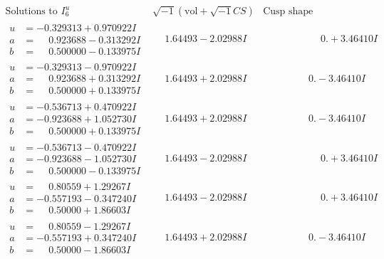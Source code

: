 \documentclass[1p]{elsarticle_modified}
\theoremstyle{definition}
\newcommand{\I}{\sqrt{-1}}
\begin{document}
$$\begin{array}{c|c|c}  
\text{Solutions to }I^u_{6}& \I (\text{vol} + \sqrt{-1}CS) & \text{Cusp shape}\\
 \hline 
\begin{aligned}
u &= -0.329313 + 0.970922 I \\
a &= \phantom{-}0.923688 - 0.313292 I \\
b &= \phantom{-}0.500000 - 0.133975 I\end{aligned}
 & \phantom{-}1.64493 - 2.02988 I & \phantom{-0.000000 -}0. + 3.46410 I \\ \hline\begin{aligned}
u &= -0.329313 - 0.970922 I \\
a &= \phantom{-}0.923688 + 0.313292 I \\
b &= \phantom{-}0.500000 + 0.133975 I\end{aligned}
 & \phantom{-}1.64493 + 2.02988 I & \phantom{-0.000000 } 0. - 3.46410 I \\ \hline\begin{aligned}
u &= -0.536713 + 0.470922 I \\
a &= -0.923688 + 1.052730 I \\
b &= \phantom{-}0.500000 + 0.133975 I\end{aligned}
 & \phantom{-}1.64493 + 2.02988 I & \phantom{-0.000000 } 0. - 3.46410 I \\ \hline\begin{aligned}
u &= -0.536713 - 0.470922 I \\
a &= -0.923688 - 1.052730 I \\
b &= \phantom{-}0.500000 - 0.133975 I\end{aligned}
 & \phantom{-}1.64493 - 2.02988 I & \phantom{-0.000000 -}0. + 3.46410 I \\ \hline\begin{aligned}
u &= \phantom{-}0.80559 + 1.29267 I \\
a &= -0.557193 - 0.347240 I \\
b &= \phantom{-}0.50000 + 1.86603 I\end{aligned}
 & \phantom{-}1.64493 - 2.02988 I & \phantom{-0.000000 -}0. + 3.46410 I \\ \hline\begin{aligned}
u &= \phantom{-}0.80559 - 1.29267 I \\
a &= -0.557193 + 0.347240 I \\
b &= \phantom{-}0.50000 - 1.86603 I\end{aligned}
 & \phantom{-}1.64493 + 2.02988 I & \phantom{-0.000000 } 0. - 3.46410 I \\ \hline\begin{aligned}

\end{aligned}
\end{array}$$
\end{document}
